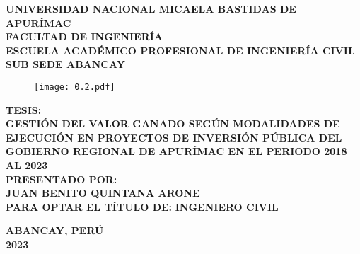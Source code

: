 
\begin{titlepage}

	\begin{center}
		\textbf{\Large{UNIVERSIDAD NACIONAL MICAELA BASTIDAS DE APURÍMAC}}\\
		\vspace{5mm}
		\normalsize{\textbf{FACULTAD DE INGENIERÍA}}\\
		\vspace{5mm}
		\normalsize{\textbf{ESCUELA ACADÉMICO PROFESIONAL DE INGENIERÍA CIVIL}}\\
		\vspace{5mm}
		\normalsize{\textbf{SUB SEDE ABANCAY}}
		\vspace{5mm}
		\begin{figure}[h!]
			\centering
			\texttt{[image: 0.2.pdf]}
		\end{figure}
		\vspace{3mm}
		\textbf{ TESIS:}\\
		\vspace{5mm}
		\textbf{GESTIÓN DEL VALOR GANADO SEGÚN MODALIDADES DE EJECUCIÓN EN PROYECTOS DE INVERSIÓN PÚBLICA DEL GOBIERNO REGIONAL DE APURÍMAC EN EL PERIODO 2018 AL 2023}\\
		\vspace{5mm}
		\textbf{PRESENTADO POR:}\\
		\vspace{5mm}
		\textbf{JUAN BENITO QUINTANA ARONE}\\
		\vspace{5mm}
		\textbf{ PARA OPTAR EL TÍTULO DE:}
		\vspace{5mm}
		\textbf{INGENIERO CIVIL}\\
		\vspace{10mm}
		
		\vfill
		\textbf{ABANCAY, PERÚ}\\
		\vspace{5mm}
		\textbf{2023}\\
	\end{center}
\end{titlepage}

